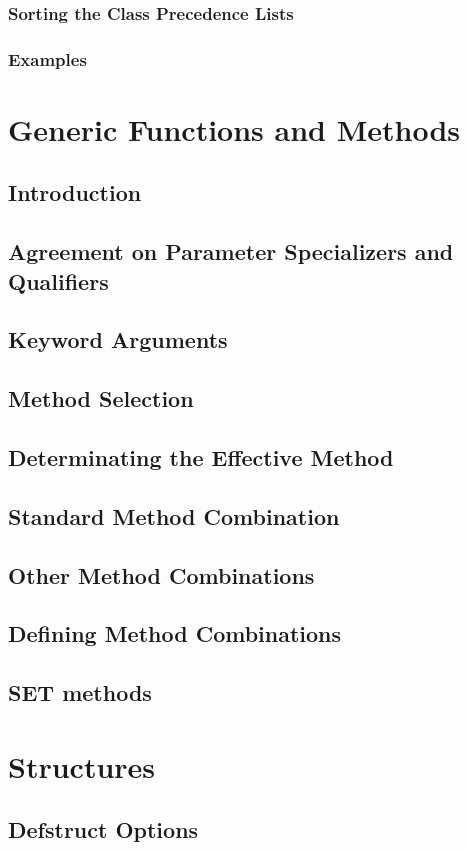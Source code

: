 \documentclass[10pt]{book}
\begin{document}
\subsubsection{Sorting the  Class Precedence Lists}
\subsubsection{Examples}
\section{Generic Functions and Methods}
\subsection{Introduction}
\subsection{Agreement on Parameter Specializers and Qualifiers}
\subsection{Keyword Arguments}
\subsection{Method Selection}
\subsection{Determinating the Effective Method}
\subsection{Standard Method Combination}
\subsection{Other Method Combinations}
\subsection{Defining Method Combinations}
\subsection{SET methods}
\section{Structures}
\subsection{Defstruct Options}
\end{document}
